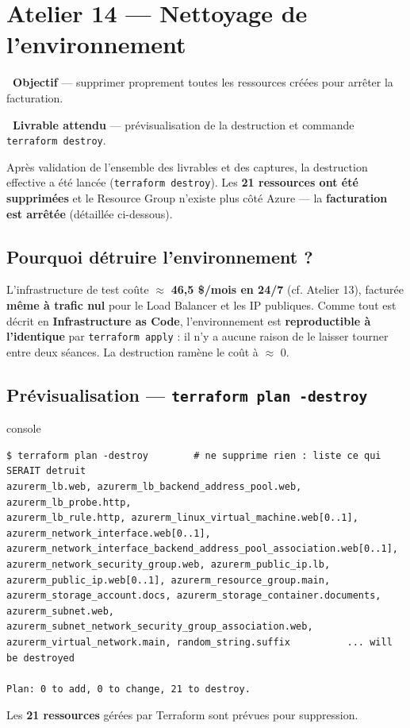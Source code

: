 \documentclass[11pt,a4paper]{article}
\newcommand{\emo}[1]{\raisebox{-0.14em}{\twemoji{#1}}}
\newcommand{\eTarget}{\emo{1f3af}}
\newcommand{\ePackage}{\emo{1f4e6}}
\newcommand{\code}[1]{\texttt{#1}}
\begin{document}
\section{Atelier 14 — Nettoyage de l'environnement}

\begin{fiche}
\textbf{\eTarget~Objectif} — supprimer proprement toutes les ressources créées pour arrêter la facturation.

\textbf{\ePackage~Livrable attendu} — prévisualisation de la destruction et commande \code{terraform destroy}.
\end{fiche}

\begin{etatbox}
Après validation de l'ensemble des livrables et des captures, la destruction effective a été lancée
(\code{terraform destroy}). Les \textbf{21 ressources ont été supprimées} et le Resource Group n'existe plus
côté Azure — la \textbf{facturation est arrêtée} (détaillée ci-dessous).
\end{etatbox}

\subsection{Pourquoi détruire l'environnement ?}
L'infrastructure de test coûte $\approx$ \textbf{46,5 \$/mois en 24/7} (cf. Atelier 13), facturée \textbf{même
à trafic nul} pour le Load Balancer et les IP publiques. Comme tout est décrit en \textbf{Infrastructure as
Code}, l'environnement est \textbf{reproductible à l'identique} par \code{terraform apply} : il n'y a aucune
raison de le laisser tourner entre deux séances. La destruction ramène le coût à $\approx$ 0.

\subsection{Prévisualisation — \code{terraform plan -destroy}}
\begin{codebox}{console}
\begin{Verbatim}
$ terraform plan -destroy        # ne supprime rien : liste ce qui SERAIT detruit
azurerm_lb.web, azurerm_lb_backend_address_pool.web, azurerm_lb_probe.http,
azurerm_lb_rule.http, azurerm_linux_virtual_machine.web[0..1],
azurerm_network_interface.web[0..1],
azurerm_network_interface_backend_address_pool_association.web[0..1],
azurerm_network_security_group.web, azurerm_public_ip.lb,
azurerm_public_ip.web[0..1], azurerm_resource_group.main,
azurerm_storage_account.docs, azurerm_storage_container.documents,
azurerm_subnet.web, azurerm_subnet_network_security_group_association.web,
azurerm_virtual_network.main, random_string.suffix          ... will be destroyed

Plan: 0 to add, 0 to change, 21 to destroy.
\end{Verbatim}
\end{codebox}
Les \textbf{21 ressources} gérées par Terraform sont prévues pour suppression.
\end{document}
